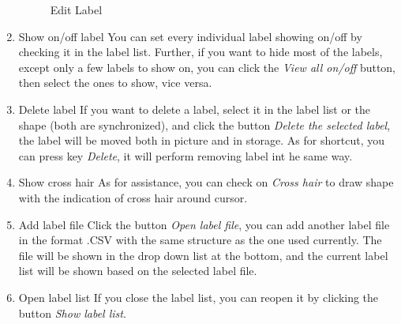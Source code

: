 \documentclass[12pt]{article}
\begin{document}
\begin{enumerate}
\begin{figure}[htbp]
		\caption[Edit Label]{Edit Label}
		\label{fig:edit_label}
	\end{figure}
	\item Show on/off label
	\newline You can set every individual label showing on/off by checking it in the label list. Further, if you want to hide most of the labels, except only a few labels to show on, you can click the \textit{View all on/off} button, then select the ones to show,  vice versa.
	\item Delete label
	\newline If you want to delete a label, select it in the label list or the shape (both are synchronized), and click the button \textit{Delete the selected label}, the label will be moved both in picture and in storage. As for shortcut, you can press key \textit{Delete}, it will perform removing label int he same way.
	\item Show cross hair
	\newline As for assistance, you can check on \textit{Cross hair} to draw shape with the indication of cross hair around cursor.
	\item Add label file
	\newline Click the button \textit{Open label file}, you can add another label file in the format .CSV with the same structure as the one used currently. The file will be shown in the drop down list at the bottom, and the current label list will be shown based on the selected label file.
	\item Open label list
	\newline If you close the label list, you can reopen it by clicking the button \textit{Show label list}.
\end{enumerate}
\end{document}
